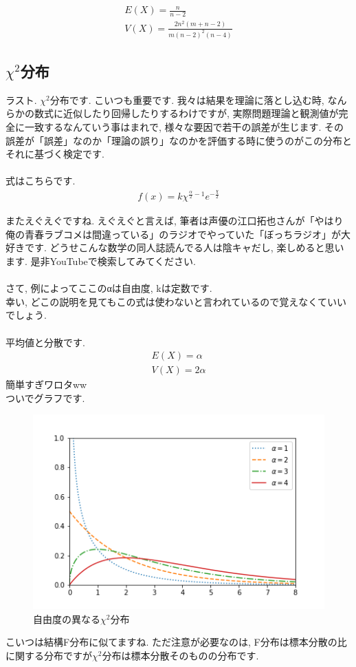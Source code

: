 \documentclass[11pt,a4paper]{jsarticle}                    %
\begin{document}
\begin{eqnarray}
E(X) = \frac{n}{n-2}\\
V(X) = \frac{2n^2 (m+n-2)}{m(n-2)^2(n-4)}
\end{eqnarray}

\subsection{$\chi^2$分布}
ラスト. $\chi^2$分布です. こいつも重要です. 我々は結果を理論に落とし込む時, なんらかの数式に近似したり回帰したりするわけですが, 実際問題理論と観測値が完全に一致するなんていう事はまれで, 様々な要因で若干の誤差が生じます. その誤差が「誤差」なのか「理論の誤り」なのかを評価する時に使うのがこの分布とそれに基づく検定です. \\
\\
式はこちらです. 
\begin{eqnarray}
f(x) = k\chi^{\frac{\alpha}{2}-1}e^{-\frac{\chi}{2}}
\end{eqnarray}

またえぐえぐですね. えぐえぐと言えば, 筆者は声優の江口拓也さんが「やはり俺の青春ラブコメは間違っている」のラジオでやっていた「ぼっちラジオ」が大好きです. どうせこんな数学の同人誌読んでる人は陰キャだし, 楽しめると思います. 是非YouTubeで検索してみてください.\\
\\
さて, 例によってここのαは自由度, kは定数です.\\
幸い, どこの説明を見てもこの式は使わないと言われているので覚えなくていいでしょう.\\
\\
平均値と分散です.
\begin{eqnarray}
E(X) = \alpha \\
V(X) = 2\alpha
\end{eqnarray}
簡単すぎワロタww\\
ついでグラフです.


\begin{figure}[H]
\label{im:chi}
  \centering
  \includegraphics[width=120mm,bb=0 0 432 288]{figures/kai.png}
  \caption{自由度の異なる$\chi^2$分布}
\end{figure}
 こいつは結構F分布に似てますね. ただ注意が必要なのは, F分布は標本分散の比に関する分布ですが$\chi^2$分布は標本分散そのものの分布です.
\end{document}

